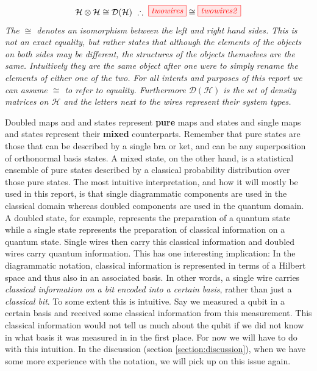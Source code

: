 \documentclass[]{article}
\begin{document}
\begin{equation}
\label{equation:doubledwires}
\mathcal{H} \otimes \mathcal{H} \cong \mathcal{D}(\mathcal{H}) ~ \therefore ~\tikzfig{twowires} \cong \tikzfig{twowires2}
\end{equation}
\textit{The $\cong$ denotes an isomorphism between the left and right hand sides. This is not an exact equality, but rather states that although the elements of the objects on both sides may be different, the structures of the objects themselves are the same. Intuitively they are the same object after one were to simply rename the elements of either one of the two. For all intents and purposes of this report we can assume $\cong$ to refer to equality. Furthermore $\mathcal{D}(\mathcal{H})$ is the set of density matrices on $\mathcal{H}$ and the letters next to the wires represent their system types.}

Doubled maps and and states represent \textbf{pure} maps and states and single maps and states represent their \textbf{mixed} counterparts. Remember that pure states are those that can be described by a single bra or ket, and can be any superposition of orthonormal basis states. A mixed state, on the other hand, is a statistical ensemble of pure states described by a classical probability distribution over those pure states. The most intuitive interpretation, and how it will mostly be used in this report, is that single diagrammatic components are used in the classical domain whereas doubled components are used in the quantum domain. A doubled state, for example, represents the preparation of a quantum state while a single state represents the preparation of classical information on a quantum state. Single wires then carry this classical information and doubled wires carry quantum information. This has one interesting implication: In the diagrammatic notation, classical information is represented in terms of a Hilbert space and thus also in an associated basis. In other words, a single wire carries \textit{classical information on a bit encoded into a certain basis}, rather than just a \textit{classical bit}. To some extent this is intuitive. Say we measured a qubit in a certain basis and received some classical information from this measurement. This classical information would not tell us much about the qubit if we did not know in what basis it was measured in in the first place. For now we will have to do with this intuition. In the discussion (section \ref{section:discussion}), when we have some more experience with the notation, we will pick up on this issue again.
\end{document}

